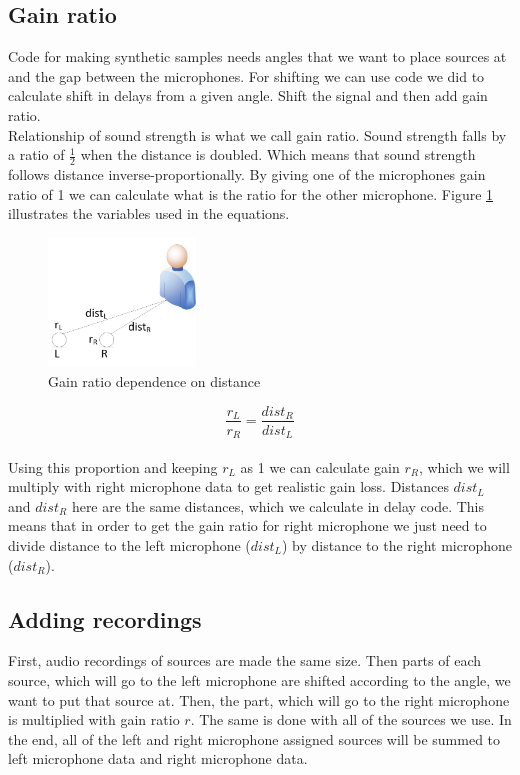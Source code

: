   \subsection{Gain ratio}
  Code for making synthetic samples needs angles that we want to place sources at and the gap between the 
microphones. For shifting we can use code we did to calculate shift in delays from a given angle. Shift the signal 
and then add gain ratio. \\
  Relationship of sound strength is what we call gain ratio. Sound strength falls by a ratio of \( \frac{1}{2}
\) when the distance is doubled. Which means that sound strength follows distance inverse-proportionally. 
  By giving one of the microphones gain ratio of 1 we can calculate what is the ratio for the other 
microphone. Figure \ref{fig:ratioDependence} illustrates the variables used in the equations.
\begin{figure}[htp]
	\centering
	\includegraphics[width=0.35\textwidth]{Illustrations/gainRatio.jpg}
	\caption{Gain ratio dependence on distance}
	\label{fig:ratioDependence}
\end{figure}
 \[\frac{r_L}{r_R} = \frac{dist_R}{dist_L} \]\\
Using this proportion and keeping \(r_L\) as 1 we can calculate gain \(r_R\), which we will multiply with 
right microphone data to get realistic gain loss. Distances \(dist_L\) and \(dist_R\) here are the same 
distances, which we calculate in delay code. This means that in order to get the gain ratio for right 
microphone we just need to divide distance to the left microphone (\(dist_L\)) by distance to the right 
microphone (\(dist_R\)).
\subsection{Adding recordings}
First, audio recordings of sources are made the same size. Then parts of each source, which will go to the left 
microphone are shifted according to the angle, we want to put that source at. Then, the part, which will go to the 
right microphone is multiplied with gain ratio \(r\). The same is done with all of the sources we use. In the end, 
all of the left and right microphone assigned sources will be summed to left microphone data and right microphone 
data. 
